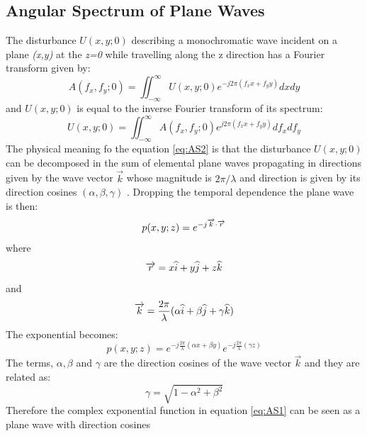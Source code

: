 \subsection{Angular Spectrum of Plane Waves}
\label{sec:angular 2}
The disturbance $U(x,y;0)$ describing a monochromatic wave incident on a plane \textit{(x,y)} at the \textit{z=0} while travelling along the z direction has a Fourier transform given by:
\begin{equation}
\label{eq:AS1}
A(f_x,f_y;0)=\iint_{-\infty}^{\infty} U(x,y;0)e^{-j2\pi(f_x x+f_y y)}dx dy
\end{equation}
and $U(x,y;0)$ is equal to the inverse Fourier transform of its spectrum:
\begin{equation}
\label{eq:AS2}
U(x,y;0)=\iint_{-\infty}^{\infty} A(f_x,f_y;0)e^{j2\pi(f_x x+f_y y)}df_x df_y
\end{equation}
The physical meaning fo the equation \ref{eq:AS2} is that the disturbance $U(x,y;0)$ can be decomposed in the sum of elemental plane waves propagating in directions given by the wave vector $\overrightarrow{k}$ whose magnitude is $2\pi/\lambda$ and direction is given by its direction cosines $(\alpha,\beta,\gamma)$ \cite{goodman2005introduction,matsushima2009band}.
Dropping the temporal dependence the plane wave is then:
\begin{equation}
\label{eq:AS3}
p(x,y;z)=e^{-j\overrightarrow{k}\cdot\overrightarrow{r}}\\
\end{equation}
where
\begin{equation}
\label{eq:AS4}
 \overrightarrow{r}=x\widehat{i}+y\widehat{j}+z\widehat{k}\\
\end{equation}
and
\begin{equation}
\label{eq:AS5}
 \overrightarrow{k}=\dfrac{2\pi}{\lambda}(\alpha\widehat{i}+\beta\widehat{j}+\gamma\widehat{k})	\\
\end{equation}
The exponential becomes:
\begin{equation}
\label{eq:AS6}
p(x,y;z)=e^{-j\frac{2\pi}{\lambda}(\alpha x+\beta y)}e^{-j\frac{2\pi}{\lambda}(\gamma z)}
\end{equation}
The terms, $\alpha, \beta$ and $\gamma$ are the direction cosines of the wave vector $\overrightarrow{k}$ and they are related as:
\begin{equation}
\label{eq:AS7}
\gamma = \sqrt{1-\alpha^2+\beta^2}
\end{equation}
Therefore the complex exponential function in equation \ref{eq:AS1} can be seen as a plane wave with direction cosines
